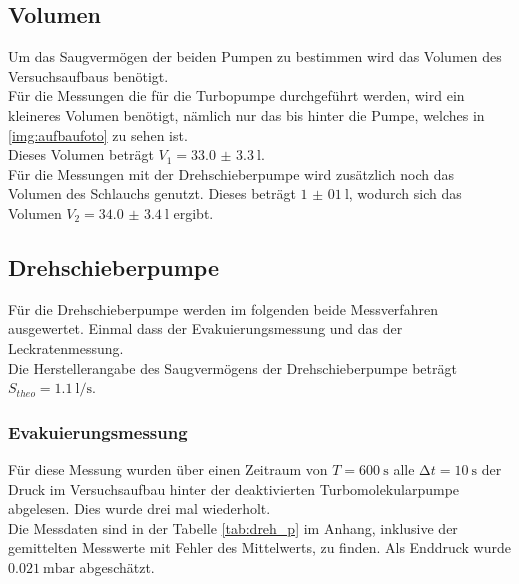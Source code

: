       \subsection{Volumen}
        Um das Saugvermögen der beiden Pumpen zu bestimmen wird das Volumen des Versuchsaufbaus benötigt.\\
        Für die Messungen die für die Turbopumpe durchgeführt werden, wird ein kleineres Volumen benötigt, nämlich nur das bis hinter die Pumpe, 
        welches in \ref{img:aufbaufoto} zu sehen ist.\\
        Dieses Volumen beträgt $V_1 = \SI{33.0(33)}{\litre}$.\\
        Für die Messungen mit der Drehschieberpumpe wird zusätzlich noch das Volumen des Schlauchs genutzt. 
        Dieses beträgt $\SI{1(01)}{\litre}$, wodurch sich das Volumen $V_2 = \SI{34.0(34)}{\litre}$ ergibt.\\



      \subsection{Drehschieberpumpe}

        \noindent Für die Drehschieberpumpe werden im folgenden beide Messverfahren ausgewertet. Einmal dass der Evakuierungsmessung und das der Leckratenmessung.\\
        Die Herstellerangabe des Saugvermögens der Drehschieberpumpe beträgt $ S_{theo} = \SI{1.1}{\litre\per\second}$.

        \subsubsection{Evakuierungsmessung}

        \noindent Für diese Messung wurden über einen Zeitraum von $ T = \SI{600}{\second}$ alle $ \increment t = \SI{10}{\second}$
        der Druck im Versuchsaufbau hinter der deaktivierten Turbomolekularpumpe abgelesen. Dies wurde drei mal wiederholt.\\
        Die Messdaten sind in der Tabelle \ref{tab:dreh_p} im Anhang, inklusive der gemittelten Messwerte mit Fehler des Mittelwerts, zu finden.
        Als Enddruck wurde $\SI{0.021}{\milli\bar}$ abgeschätzt.\\\\
        
